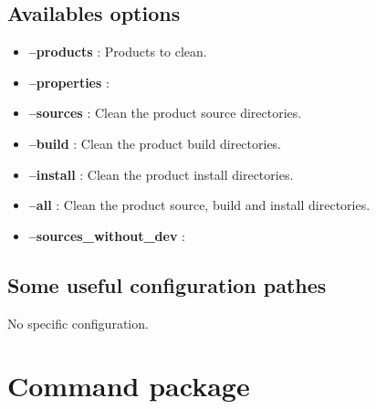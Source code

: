 \documentclass[a4paper,10pt,english]{sphinxmanual}
\begin{document}
\subsection{Availables options}
\label{commands/clean:availables-options}\begin{itemize}
\item {} 
\textbf{--products} : Products to clean.

\item {} 
\textbf{--properties} :


\item {} 
\textbf{--sources} : Clean the product source directories.

\item {} 
\textbf{--build} : Clean the product build directories.

\item {} 
\textbf{--install} : Clean the product install directories.

\item {} 
\textbf{--all} : Clean the product source, build and install directories.

\item {} 
\textbf{--sources\_without\_dev} :


\end{itemize}


\subsection{Some useful configuration pathes}
\label{commands/clean:some-useful-configuration-pathes}
No specific configuration.
\clearpage

\section{Command package}
\label{commands/package:svn}\label{commands/package:command-package}\label{commands/package::doc}
\end{document}
